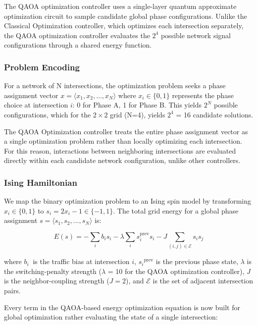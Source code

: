 \documentclass[12pt]{article}
\begin{document}
The QAOA optimization controller uses a single-layer quantum approximate optimization circuit to sample candidate global phase configurations. Unlike the Classical Optimization controller, which optimizes each intersection separately, the QAOA optimization controller evaluates the \(2^{4}\) possible network signal configurations through a shared energy function.

\subsubsection{Problem Encoding}

For a network of N intersections, the optimization problem seeks a phase assignment vector $x = \langle x_1, x_2, \ldots , x_N \rangle$ where $x_i \in \{0,1\}$ represents the phase choice at intersection $i$: 0 for Phase A, 1 for Phase B. This yields \(2^{N}\) possible configurations, which for the $2 \times 2$ grid (N=4), yields \(2^{4}\) = 16 candidate solutions.

The QAOA Optimization controller treats the entire phase assignment vector as a single optimization problem rather than locally optimizing each intersection. For this reason, interactions between neighboring intersections are evaluated directly within each candidate network configuration, unlike other controllers.

\subsubsection{Ising Hamiltonian}

We map the binary optimization problem to an Ising spin model by transforming$x_i \in \{0,1\}$ to $s_i = 2x_i - 1 \in \{-1, 1\}$. The total grid energy for a global phase assignment $s = \langle s_1, s_2, \ldots , s_N \rangle$ is:

\begin{equation}
\label{eq:total_energy}
    E(s) = -\sum_i b_i s_i - \lambda \sum_i s_i^{\text{prev}} s_i - J \sum_{(i,j)\in\mathcal{E}} s_i s_j
\end{equation}



where \(b_{i}\ \) is the traffic bias at intersection $i$, ${s_{i}}^{\text{prev}}$ is the previous phase state, $\lambda$ is the switching-penalty strength ($\lambda$ = 10 for the QAOA optimization controller), $J$ is the neighbor-coupling strength ($J = 2$), and $\mathcal{E}$ is the set of adjacent intersection pairs.

Every term in the QAOA-based energy optimization equation is now built for global optimization rather evaluating the state of a single intersection:
\end{document}
